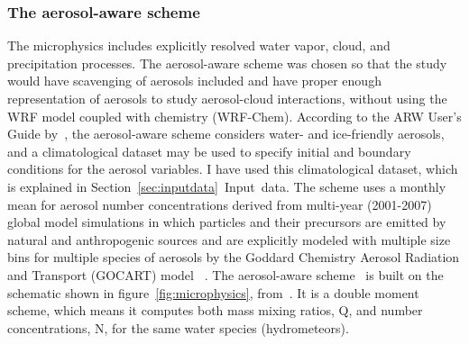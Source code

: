 \subsubsection{The aerosol-aware scheme}
The microphysics includes explicitly resolved water vapor, cloud, and precipitation processes. The aerosol-aware scheme was chosen so that the study would have scavenging of aerosols included and have proper enough representation of aerosols to study aerosol-cloud interactions, without using the WRF model coupled with chemistry (WRF-Chem).
According to the ARW User's Guide by~\citet{Wang2015}, the aerosol-aware scheme considers water- and ice-friendly aerosols, and a climatological dataset may be used to specify initial and boundary conditions for the aerosol variables. I have used this climatological dataset, which is explained in Section~\ref{sec:inputdata}~Input~data. The scheme uses a monthly mean for aerosol number concentrations derived from multi-year (2001-2007) global model simulations in which particles and their precursors are emitted by natural and anthropogenic sources and are explicitly modeled with multiple size bins for multiple species of aerosols by the Goddard Chemistry Aerosol Radiation and Transport (GOCART) model %
~\citep{Thompson2014}.
The aerosol-aware scheme~\citep{Thompson2014} is built on the schematic shown in figure~\ref{fig:microphysics}, from~\citet{Reisner1998}. It is a double moment scheme, which means it computes both mass mixing ratios, Q, and number concentrations, N, for the same water species (hydrometeors). 

